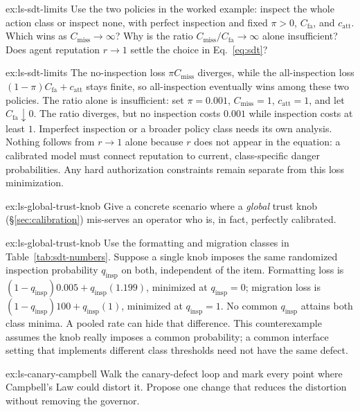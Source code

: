 \documentclass[11pt,a4paper]{article}
\theoremstyle{definition}
\theoremstyle{plain}
\begin{document}
\begin{pdexercise}[kind=Check,rating=1]{ex:ls-sdt-limits}
Use the two policies in the worked example: inspect the whole action class
or inspect none, with perfect inspection and fixed $\pi>0$, $C_{\text{fa}}$, and
$c_{\mathrm{att}}$. Which wins as $C_{\text{miss}}\to\infty$? Why is the ratio
$C_{\text{miss}}/C_{\text{fa}}\to\infty$ alone insufficient? Does agent reputation
$r\to1$ settle the choice in Eq.~\ref{eq:sdt}?
\end{pdexercise}
\begin{pdsolution}{ex:ls-sdt-limits}
The no-inspection loss $\pi C_{\mathrm{miss}}$ diverges, while the
all-inspection loss $(1-\pi)C_{\mathrm{fa}}+c_{\mathrm{att}}$ stays finite, so
all-inspection eventually wins among these two policies. The ratio alone is
insufficient: set $\pi=0.001$, $C_{\mathrm{miss}}=1$, $c_{\mathrm{att}}=1$, and
let $C_{\mathrm{fa}}\downarrow0$. The ratio diverges, but no inspection costs
$0.001$ while inspection costs at least $1$. Imperfect inspection or a broader
policy class needs its own analysis. Nothing follows from $r\to1$ alone because
$r$ does not appear in the equation: a calibrated model must connect reputation
to current, class-specific danger probabilities. Any hard authorization
constraints remain separate from this loss minimization.
\end{pdsolution}
\begin{pdexercise}[kind=Check,rating=1]{ex:ls-global-trust-knob}
Give a
concrete scenario where a \emph{global} trust knob (\S\ref{sec:calibration})
mis-serves an operator who is, in fact, perfectly calibrated.
\end{pdexercise}
\begin{pdsolution}{ex:ls-global-trust-knob}
Use the formatting and migration classes in Table~\ref{tab:sdt-numbers}.
Suppose a single knob imposes the same randomized inspection probability $q_{\mathrm{insp}}$
on both, independent of the item. Formatting loss is
$(1-q_{\mathrm{insp}})0.005+q_{\mathrm{insp}}(1.199)$, minimized at $q_{\mathrm{insp}}=0$; migration loss is
$(1-q_{\mathrm{insp}})100+q_{\mathrm{insp}}(1)$, minimized at $q_{\mathrm{insp}}=1$. No common $q_{\mathrm{insp}}$ attains both class minima.
A pooled rate can hide that difference. This counterexample assumes the knob
really imposes a common probability; a common interface setting that implements
different class thresholds need not have the same defect.
\end{pdsolution}
\begin{pdexercise}[kind=Trace,rating=2]{ex:ls-canary-campbell}
Walk the canary-defect loop and mark every point where Campbell's Law could
distort it. Propose one change that reduces the distortion without removing the
governor.
\end{pdexercise}
\end{document}
